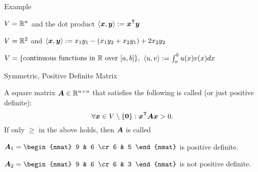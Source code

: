 \documentclass[handout,fleqn,aspectratio=169]{beamer}
\begin{document}
\begin{frame}{Example}

\plitemsep 0.3in

\bci 

\item \exam $V={\mathbb R}^n$ and the dot product $\left\langle \bm{x}, \bm{y} \right\rangle := {\bm{x}}^{\mathsf{T}}\bm{y}$

\item \exam $V={\mathbb R}^2$ and $\left\langle \bm{x}, \bm{y} \right\rangle := x_1y_1 - (x_1y_2 + x_2y_1) + 2x_2y_2$

\item \exam $V=\{\text{continuous functions in ${\mathbb R}$ over $[a,b]$} \},$ $\left\langle u, v \right\rangle := \int_a^b u(x)v(x) dx$
\eci
\end{frame}

\begin{frame}{Symmetric, Positive Definite Matrix}

\plitemsep 0.1in

\bci 
\item A square matrix $\bm{A} \in {\mathbb R}^{n \times n}$ that satisfies the following is called  (or just positive definite): 
$$
\forall \bm{x} \in V \setminus \{\bm{0} \}: {\bm{x}}^{\mathsf{T}} \bm{A} \bm{x} > 0.
$$
If only $\ge$ in the above holds, then $\bm{A}$ is called  

\bigskip
\item $\mat{A}_1 = \begin{nmat}
9 & 6 \cr
6 & 5
\end{nmat}
$ is positive definite.

\item $\mat{A}_2 = \begin{nmat}
9 & 6 \cr
6 & 3
\end{nmat}
$ is not positive definite.



\eci
\end{frame}
\end{document}
